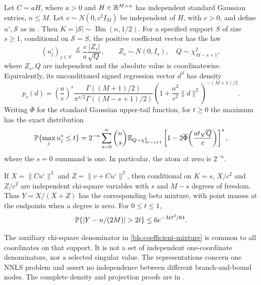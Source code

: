\begin{theorem}
\label{bls:nnls-law}
Let $C=aH$, where $a>0$ and $H\in\mathbb{R}^{M\times n}$ has independent
standard Gaussian entries, $n\le M$.  Let $v\sim N(0,c^2I_M)$ be
independent of $H$, with $c>0$, and define $u^\circ,\mathcal S$ as in
.  Then $K=|\mathcal S|\sim\operatorname{Bin}(n,1/2)$.
For a specified support $S$ of size $s\ge1$, conditional on
$\mathcal S=S$, the positive coefficient vector has the law
\begin{equation}
 (u_j^\circ)_{j\in S}\ \stackrel d=
 \frac ca\frac{|Z_s|}{\sqrt Q},\qquad
 Z_s\sim N(0,I_s),\quad Q\sim\chi^2_{M-s+1},
 \label{bls:coefficient-mixture}
\end{equation}
where $Z_s,Q$ are independent and the absolute value is coordinatewise.
Equivalently, its unconditioned signed regression vector $d^S$ has density
\begin{equation}
 p_s(d)=\left(\frac ac\right)^s
 \frac{\Gamma((M+1)/2)}{\pi^{s/2}\Gamma((M-s+1)/2)}
 \left(1+\frac{a^2}{c^2}\|d\|^2\right)^{-(M+1)/2}.
 \label{bls:student-density}
\end{equation}
Writing $\overline\Phi$ for the standard Gaussian upper-tail function,
for $t\ge0$ the maximum has the exact distribution
\begin{equation}
 \mathbb{P}\{\max_j u_j^\circ\le t\}
 =2^{-n}\sum_{s=0}^n\binom ns
  \mathbb{E}_{Q\sim\chi^2_{M-s+1}}
  \left[1-2\overline\Phi\!\left(\frac{at\sqrt Q}{c}\right)\right]^s,
 \label{bls:maximum-cdf}
\end{equation}
where the $s=0$ summand is one.  In particular, the atom at zero is $2^{-n}$.

If $X=\|Cu^\circ\|^2$ and $Z=\|v+Cu^\circ\|^2$, then conditional on
$K=s$, $X/c^2$ and $Z/c^2$ are independent chi-square variables with
$s$ and $M-s$ degrees of freedom.  Thus
$Y=X/(X+Z)$ has the corresponding beta mixture, with point masses at the
endpoints when a degree is zero.  For $0\le t\le1$,
\begin{equation}
 \Pbb\{|Y-n/(2M)|>2t\}\le6e^{-Mt^2/64}.
 \label{bls:projection-concentration}
\end{equation}
\end{theorem}

The auxiliary chi-square denominator in \eqref{bls:coefficient-mixture}
is common to all coordinates on that support.  It is not a set of
independent one-coordinate denominators, nor a selected singular value.
The representations concern one NNLS problem and assert no independence
between different branch-and-bound nodes.  The complete density and
projection proofs are in .

